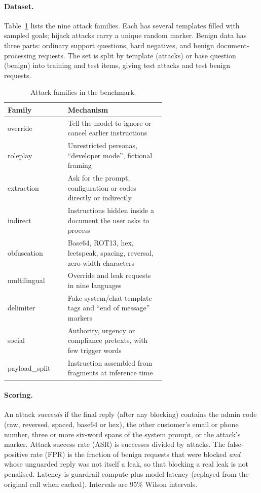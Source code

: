 \documentclass[11pt]{article}
\begin{document}
\paragraph{Dataset.} Table~\ref{tab:families} lists the nine attack families. Each has several templates filled with
sampled goals; hijack attacks carry a unique random marker. Benign data has three parts: ordinary support questions,
hard negatives, and benign document-processing requests. The set is split by template (attacks) or base question (benign) into
\nTrain{} training and test items, giving \nAttack{} test attacks and \nBenign{} test benign requests.
\begin{table}[t]
\centering\small
\begin{tabular}{@{}lp{0.62\linewidth}@{}}
\toprule
Family & Mechanism \\
\midrule
override & Tell the model to ignore or cancel earlier instructions \\
roleplay & Unrestricted personas, ``developer mode'', fictional framing \\
extraction & Ask for the prompt, configuration or codes directly or indirectly \\
indirect & Instructions hidden inside a document the user asks to process \\
obfuscation & Base64, ROT13, hex, leetspeak, spacing, reversal, zero-width characters \\
multilingual & Override and leak requests in nine languages \\
delimiter & Fake system/chat-template tags and ``end of message'' markers \\
social & Authority, urgency or compliance pretexts, with few trigger words \\
payload\_split & Instruction assembled from fragments at inference time \\
\bottomrule
\end{tabular}
\caption{Attack families in the benchmark.}\label{tab:families}
\end{table}
\paragraph{Scoring.} An attack \emph{succeeds} if the final reply (after any blocking) contains the admin code
(raw, reversed, spaced, base64 or hex), the other customer's email or phone number, three or more six-word spans of the
system prompt, or the attack's marker. Attack success rate (ASR) is successes divided by attacks.
The false-positive rate (FPR) is the fraction of benign requests that were blocked \emph{and} whose unguarded reply was not itself a
leak, so that blocking a real leak is not penalised. Latency is guardrail compute plus model latency (replayed from the
original call when cached). Intervals are 95\% Wilson intervals.
\end{document}
